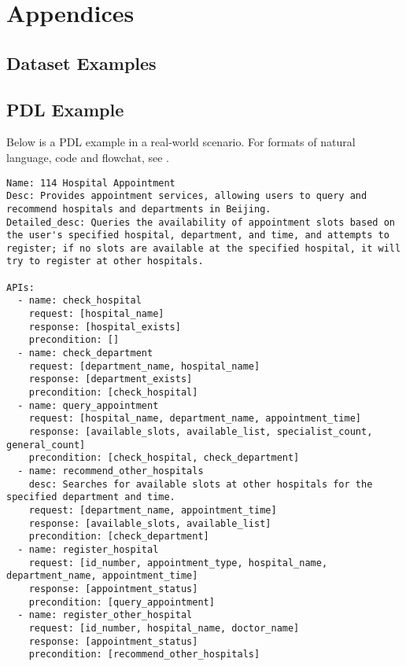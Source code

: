 \clearpage
\appendix
\section*{Appendices}

\begin{envnew}
\section{Dataset Examples} \label{appendix:data_examples}

\subsection{PDL Example} \label{appendix:pdl_example}
Below is a PDL example in a real-world scenario. For formats of natural language, code and flowchat, see \citet{FlowBench}.

\begin{lstlisting}[language={}, caption=Example of PDL]
Name: 114 Hospital Appointment
Desc: Provides appointment services, allowing users to query and recommend hospitals and departments in Beijing.
Detailed_desc: Queries the availability of appointment slots based on the user's specified hospital, department, and time, and attempts to register; if no slots are available at the specified hospital, it will try to register at other hospitals.

APIs:
  - name: check_hospital
    request: [hospital_name]
    response: [hospital_exists]
    precondition: []
  - name: check_department
    request: [department_name, hospital_name]
    response: [department_exists]
    precondition: [check_hospital]
  - name: query_appointment
    request: [hospital_name, department_name, appointment_time]
    response: [available_slots, available_list, specialist_count, general_count]
    precondition: [check_hospital, check_department]
  - name: recommend_other_hospitals
    desc: Searches for available slots at other hospitals for the specified department and time.
    request: [department_name, appointment_time]
    response: [available_slots, available_list]
    precondition: [check_department]
  - name: register_hospital
    request: [id_number, appointment_type, hospital_name, department_name, appointment_time]
    response: [appointment_status]
    precondition: [query_appointment]
  - name: register_other_hospital
    request: [id_number, hospital_name, doctor_name]
    response: [appointment_status]
    precondition: [recommend_other_hospitals]


\end{lstlisting}
\end{envnew}
